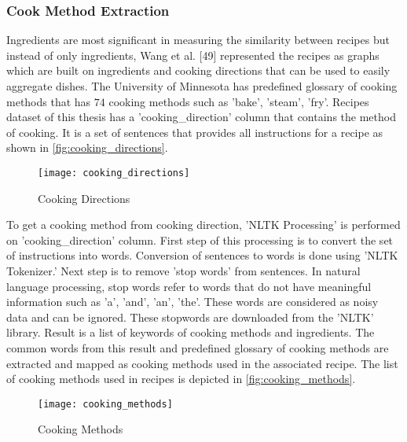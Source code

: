 \subsubsection{Cook Method Extraction}
\label{sec:cook_method}
Ingredients are most significant in measuring the similarity between recipes but instead of only ingredients, Wang et al. [49] represented the recipes as graphs which are built on ingredients and cooking directions that can be used to easily aggregate dishes. 
The University of Minnesota has predefined glossary of cooking methods \cite{50} that has $74$ cooking methods such as 'bake', 'steam', 'fry'. Recipes dataset of this thesis has a 'cooking\_direction' column that contains the method of cooking. It is a set of sentences that provides all instructions for a recipe as shown in \autoref{fig:cooking_directions}.
\begin{singlespace}
\begin{figure}[H]
	\centering
	\texttt{[image: cooking\_directions]}
	\caption{Cooking Directions }
	\label{fig:cooking_directions}
\end{figure}
\end{singlespace}

\noindent To get a cooking method from cooking direction, 'NLTK Processing' is performed on 'cooking\_direction' column.  First step of this processing is to convert the set of instructions into words. Conversion of sentences to words is done using 'NLTK Tokenizer.' Next step is to remove 'stop words' from sentences. In natural language processing, stop words refer to words that do not have meaningful information such as 'a', 'and', 'an', 'the'. These words are considered as noisy data and can be ignored. These stopwords are downloaded from the 'NLTK' library. Result is a list of keywords of cooking methods and ingredients. The common words from this result and predefined glossary of cooking methods are extracted and mapped as cooking methods used in the associated recipe. The list of cooking methods used in recipes is depicted in \autoref{fig:cooking_methods}.
\begin{singlespace}
\begin{figure}[H]
	\centering
	\texttt{[image: cooking\_methods]}
	\caption{Cooking Methods }
	\label{fig:cooking_methods}
\end{figure}  
\end{singlespace}

